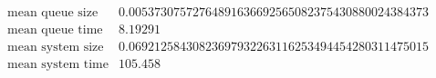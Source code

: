 \[\begin{array}{cc}
 \text{mean queue size} & 0.00537307572764891636692565082375430880024384373 \\
 \text{mean queue time} & 8.19291 \\
 \text{mean system size} & 0.06921258430823697932263116253494454280311475015 \\
 \text{mean system time} & 105.458 \\
\end{array}\]

